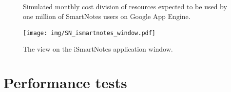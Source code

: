 \begin{figure}[ht]
  \begin{center}
  \end{center}
  \caption{Simulated monthly cost division of resources expected to be used by one million of SmartNotes users on Google App Engine.}
  \label{fig:sn_web_interface}
\end{figure}


        
\begin{figure}[ht]
\begin{center}
\texttt{[image: img/SN\_ismartnotes\_window.pdf]}
\caption{The view on the iSmartNotes application window.}
\label{fig:ismartnotes_window}
\end{center}
\end{figure}

\section{Performance tests}\label{sec:performance} 